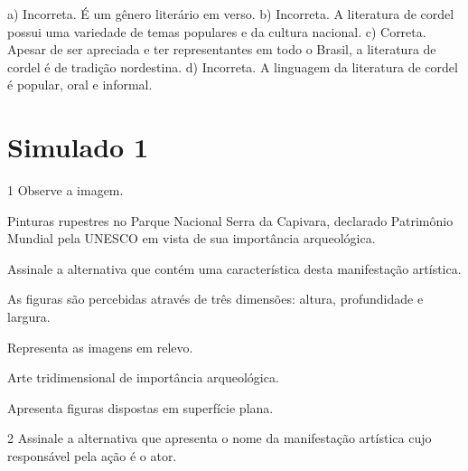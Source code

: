 \begin{escolha}
{a) Incorreta. É um gênero literário em verso.
b) Incorreta. A literatura de cordel possui uma variedade de temas
  populares e da cultura nacional.
c) Correta. Apesar de ser apreciada e ter representantes em todo o
  Brasil, a literatura de cordel é de tradição nordestina.
d) Incorreta. A linguagem da literatura de cordel é popular, oral e
  informal.}




\chapter{Simulado 1}

\num{1}  Observe a imagem.


Pinturas rupestres no Parque Nacional Serra da Capivara,
declarado Patrimônio Mundial pela UNESCO em vista de sua importância
arqueológica.

Assinale a alternativa que contém uma característica desta manifestação
artística.

\begin{escolha}
\item
  As figuras são percebidas através de três dimensões: altura,
  profundidade e largura.
\item
  Representa as imagens em relevo.
\item
  Arte tridimensional de importância arqueológica.
\item
  Apresenta figuras dispostas em superfície plana.
\end{escolha}


\num{2}  Assinale a alternativa que apresenta o nome da manifestação artística
  cujo responsável pela ação é o ator.


\end{escolha}
